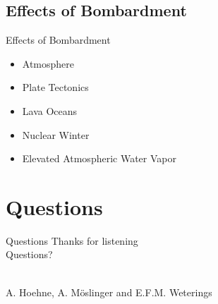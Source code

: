 \documentclass[11pt, aspectratio=169]{beamer}
\begin{document}
\subsection{Effects of Bombardment}
\begin{frame}[t]{Effects of Bombardment}
\begin{itemize}
	\item Atmosphere
	\item Plate Tectonics
	\item Lava Oceans
	\item Nuclear Winter
	\item Elevated Atmospheric Water Vapor
\end{itemize}
	
	
\end{frame}



\section{Questions}
\begin{frame}{Questions}
\centering
\Huge Thanks for listening\\

\huge Questions?\\\

\large A. Hoehne, A. M\"{o}slinger and E.F.M. Weterings\\

\end{frame}
\end{document}
